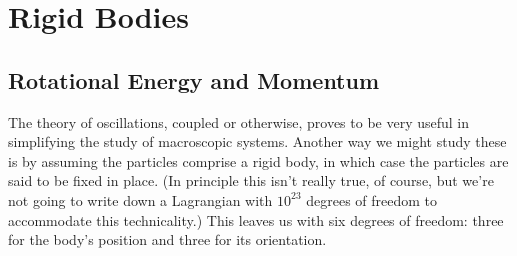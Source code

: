 \documentclass[../p111main.tex]{subfiles}
\begin{document}
\chapter{Rigid Bodies}
\section{Rotational Energy and Momentum}
The theory of oscillations, coupled or otherwise, proves to be very useful in simplifying the study of macroscopic systems.
Another way we might study these is by assuming the particles comprise a rigid body, in which case the particles are said to be fixed in place.
(In principle this isn't really true, of course, but we're not going to write down a Lagrangian with $10^{23}$ degrees of freedom to accommodate this technicality.)
This leaves us with six degrees of freedom: three for the body's position and three for its orientation.
\end{document}
